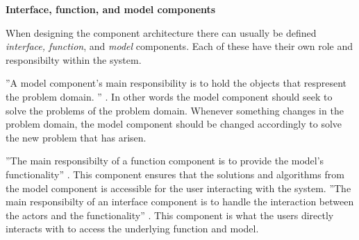 \textbf{Interface, function, and model components}

When designing the component architecture there can usually be defined \textit{interface, function}, and \textit{model} components.
Each of these have their own role and responsibilty within the system.

''A model component's main responsibility is to hold the objects that respresent the problem domain. '' \citep[p.~203]{Rod-Aalborg}.
In other words the model component should seek to solve the problems of the problem domain. 
Whenever something changes in the problem domain, the model component should be changed accordingly to solve the new problem that has arisen.

''The main responsibilty of a function component is to provide the model's functionality'' \citep[p.~205]{Rod-Aalborg}.
This component ensures that the solutions and algorithms from the model component is accessible for the user interacting with the system.
''The main responsibilty of an interface component is to handle the interaction between the actors and the functionality'' \citep[p.~207]{Rod-Aalborg}.
This component is what the users directly interacts with to access the underlying function and model.

